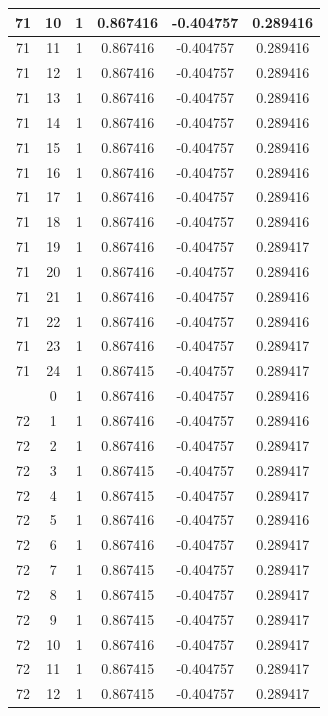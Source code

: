 \documentclass[12pt,a4paper]{article}
\numberwithin{equation}{section}
\numberwithin{figure}{section}
\numberwithin{table}{section}
\begin{document}
\begin{longtable}{|c|c|c|c|c|c|}
71 & 10 & 1 & 0.867416 & -0.404757 & 0.289416 \\ \hline
71 & 11 & 1 & 0.867416 & -0.404757 & 0.289416 \\ \hline
71 & 12 & 1 & 0.867416 & -0.404757 & 0.289416 \\ \hline
71 & 13 & 1 & 0.867416 & -0.404757 & 0.289416 \\ \hline
71 & 14 & 1 & 0.867416 & -0.404757 & 0.289416 \\ \hline
71 & 15 & 1 & 0.867416 & -0.404757 & 0.289416 \\ \hline
71 & 16 & 1 & 0.867416 & -0.404757 & 0.289416 \\ \hline
71 & 17 & 1 & 0.867416 & -0.404757 & 0.289416 \\ \hline
71 & 18 & 1 & 0.867416 & -0.404757 & 0.289416 \\ \hline
71 & 19 & 1 & 0.867416 & -0.404757 & 0.289417 \\ \hline
71 & 20 & 1 & 0.867416 & -0.404757 & 0.289416 \\ \hline
71 & 21 & 1 & 0.867416 & -0.404757 & 0.289416 \\ \hline
71 & 22 & 1 & 0.867416 & -0.404757 & 0.289416 \\ \hline
71 & 23 & 1 & 0.867416 & -0.404757 & 0.289417 \\ \hline
71 & 24 & 1 & 0.867415 & -0.404757 & 0.289417 \\ \hline
\pagebreak
72 & 0 & 1 & 0.867416 & -0.404757 & 0.289416 \\ \hline
72 & 1 & 1 & 0.867416 & -0.404757 & 0.289416 \\ \hline
72 & 2 & 1 & 0.867416 & -0.404757 & 0.289417 \\ \hline
72 & 3 & 1 & 0.867415 & -0.404757 & 0.289417 \\ \hline
72 & 4 & 1 & 0.867415 & -0.404757 & 0.289417 \\ \hline
72 & 5 & 1 & 0.867416 & -0.404757 & 0.289416 \\ \hline
72 & 6 & 1 & 0.867416 & -0.404757 & 0.289417 \\ \hline
72 & 7 & 1 & 0.867415 & -0.404757 & 0.289417 \\ \hline
72 & 8 & 1 & 0.867415 & -0.404757 & 0.289417 \\ \hline
72 & 9 & 1 & 0.867415 & -0.404757 & 0.289417 \\ \hline
72 & 10 & 1 & 0.867416 & -0.404757 & 0.289417 \\ \hline
72 & 11 & 1 & 0.867415 & -0.404757 & 0.289417 \\ \hline
72 & 12 & 1 & 0.867415 & -0.404757 & 0.289417 \\ \hline

\end{longtable}
\end{document}
